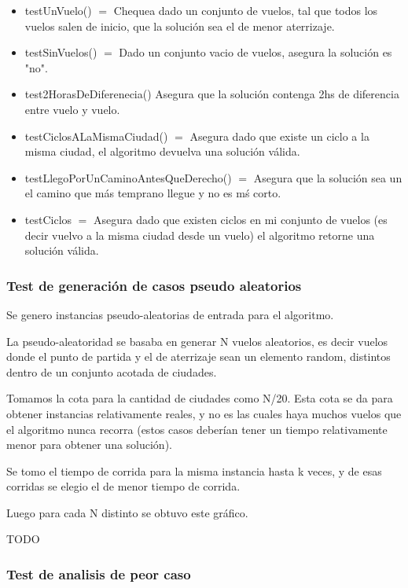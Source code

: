 \begin{itemize}
  \item testUnVuelo() $=$ Chequea dado un conjunto de vuelos, tal que todos los vuelos salen de inicio, que la soluci\'on sea el de menor aterrizaje.
  \item 	testSinVuelos() $=$ Dado un conjunto vacio de vuelos, asegura la soluci\'on es "no".
  \item test2HorasDeDiferenecia() Asegura que la soluci\'on contenga 2hs de diferencia entre vuelo y vuelo.
  \item testCiclosALaMismaCiudad() $=$ Asegura dado que existe un ciclo a la misma ciudad, el algoritmo devuelva una soluci\'on v\'alida.
  \item testLlegoPorUnCaminoAntesQueDerecho() $=$ Asegura que la soluci\'on sea un el camino que m\'as temprano llegue y no es m\'s corto.
  \item testCiclos $=$ Asegura dado que existen ciclos en mi conjunto de vuelos (es decir vuelvo a la misma ciudad desde un vuelo) el algoritmo retorne una soluci\'on v\'alida.
\end{itemize}

\subsubsection{Test de generaci\'on de casos pseudo aleatorios}

Se genero instancias pseudo-aleatorias de entrada para el algoritmo.

La pseudo-aleatoridad se basaba en generar N vuelos aleatorios, es decir vuelos donde el punto de partida y el de aterrizaje sean un elemento random, distintos dentro de un conjunto acotada de ciudades.

Tomamos la cota para la cantidad de ciudades como N/20. Esta cota se da para obtener instancias relativamente reales, y no es las cuales haya muchos vuelos que el algoritmo nunca recorra (estos casos deber\'ian tener un tiempo relativamente menor para obtener una soluci\'on).


Se tomo el tiempo de corrida para la misma instancia hasta k veces, y de esas corridas se elegio el de menor tiempo de corrida.

Luego para cada N distinto se obtuvo este gr\'afico.

TODO
\newpage
\subsubsection{Test de analisis de peor caso}

